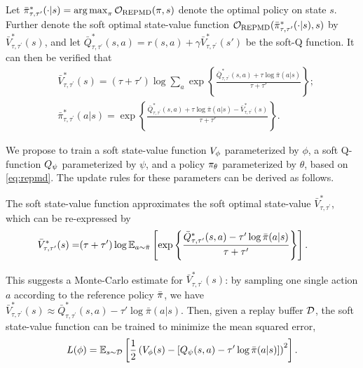 Let $\bar{\pi}_{\tau,\tau^{\prime}}^* (\cdot|s) = \operatorname*{arg\,max}_{\pi} {\mathcal{O}}_{\text{REPMD}}(\pi, s) $ denote the optimal policy on state $s$. 
%
Further denote the soft optimal state-value function ${\mathcal{O}}_{\text{REPMD}}(\bar{\pi}_{\tau,\tau^{\prime}}^* (\cdot|s), s)$ by $\bar{V}_{\tau,\tau^{\prime}}^*(s)$, and let  $\bar{Q}_{\tau,\tau^{\prime}}^*(s,a) = r(s,a) + \gamma \bar{V}_{\tau,\tau^{\prime}}^*(s')$ be the soft-Q function.
It can then be verified that 
%
{\small
\begin{equation}
\begin{split}
& \bar{V}_{\tau,\tau^{\prime}}^*(s) = (\tau + \tau') \log \sum_a \exp \left\{ \frac{\bar{Q}_{\tau,\tau^{\prime}}^*(s,a) + \tau \log \bar{\pi}(a|s)} {\tau + \tau'} \right\}; \\
& \bar{\pi}_{\tau,\tau^{\prime}}^* (a|s) = \exp \left\{ \frac{\bar{Q}_{\tau,\tau^{\prime}}^*(s,a) + \tau \log \bar{\pi}(a|s) - \bar{V}_{\tau,\tau^{\prime}}^*(s)}{\tau + \tau'} \right\}.
\end{split}
\label{soft-v-and-pi}
\end{equation}
}
 
We propose to train a
soft state-value function $V_{\phi}$ parameterized by $\phi$,
a soft Q-function $Q_{\psi}$ parameterized by $\psi$,
and a policy $\pi_{\theta}$ parameterized by $\theta$,
based on \cref{eq:repmd}.
The update rules for these parameters can be derived as follows.

The soft state-value function approximates the soft optimal state-value $\bar{V}_{\tau,\tau^{\prime}}^*$, which can be re-expressed by
{\small
\begin{align*}
\hspace{-0.3cm}
\bar{V}_{\tau,\tau^{\prime}}^*(s) 
= & (\tau + \tau') \log \E _ {a\sim \refPi} \left[ \exp \left\{ \frac{\bar{Q}_{\tau,\tau^{\prime}}^*(s,a) - \tau' \log \bar{\pi}(a|s)} {\tau + \tau'} \right\} \right].
\end{align*}
}

This suggests a Monte-Carlo estimate for
$\bar{V}_{\tau,\tau^{\prime}}^*(s)$:
by sampling one single action $a$ according to the reference policy $\bar{\pi}$,
we have $\bar{V}_{\tau,\tau^{\prime}}^*(s)
 \approx  \bar{Q}_{\tau,\tau^{\prime}}^*(s,a) - \tau' \log \bar{\pi}(a|s) $.
Then,
given a replay buffer ${\mathcal{D}}$,
the soft state-value function can be trained to minimize
the mean squared error,
%
{\small
\begin{equation}
\label{eq:trainV}
L (\phi) = \mathbb{E}_{s\sim {\mathcal{D}}} \left[ \frac{1}{2} \left( V_{\phi}(s) -  \left[ Q_{\psi}(s,a ) - \tau' \log \bar{\pi}(a|s) \right] \right)^2 \right].
\end{equation}
}

